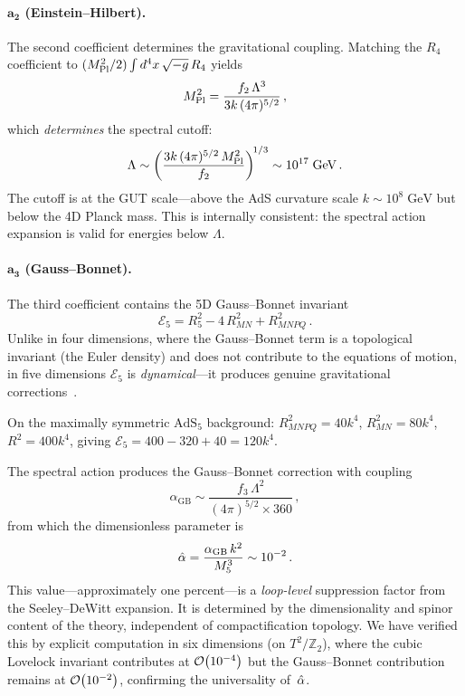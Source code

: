 \paragraph{$\bm{a_2}$ (Einstein--Hilbert).} The second coefficient determines the gravitational coupling. Matching the $R_4$ coefficient to $(M_{\mathrm{Pl}}^2/2)\int d^4x\, \sqrt{-g}\, R_4$ yields
\begin{equation}
\label{eq:1-mpl-spectral}
M_{\mathrm{Pl}}^2 = \frac{f_2\, \Lambda^3}{3k\,(4\pi)^{5/2}}\,,
\end{equation}
which \emph{determines} the spectral cutoff:
\begin{equation}
\label{eq:1-cutoff}
\Lambda \sim \left(\frac{3k\,(4\pi)^{5/2}\, M_{\mathrm{Pl}}^2}{f_2}\right)^{\!1/3} \sim 10^{17}\;\mathrm{GeV}\,.
\end{equation}
The cutoff is at the GUT scale---above the AdS curvature scale $k \sim 10^8\;\mathrm{GeV}$ but below the 4D Planck mass. This is internally consistent: the spectral action expansion is valid for energies below $\Lambda$.

\paragraph{$\bm{a_3}$ (Gauss--Bonnet).} The third coefficient contains the 5D Gauss--Bonnet invariant
\begin{equation}
\label{eq:1-gb-invariant}
\mathcal{E}_5 = R_5^2 - 4\, R_{MN}^2 + R_{MNPQ}^2\,.
\end{equation}
Unlike in four dimensions, where the Gauss--Bonnet term is a topological invariant (the Euler density) and does not contribute to the equations of motion, in five dimensions $\mathcal{E}_5$ is \emph{dynamical}---it produces genuine gravitational corrections~\cite{ch1:davis03}.

On the maximally symmetric $\mathrm{AdS}_5$ background: $R_{MNPQ}^2 = 40k^4$, $R_{MN}^2 = 80k^4$, $R^2 = 400k^4$, giving $\mathcal{E}_5 = 400 - 320 + 40 = 120k^4$.

The spectral action produces the Gauss--Bonnet correction with coupling
\begin{equation}
\label{eq:1-alpha-gb}
\alpha_{\mathrm{GB}} \sim \frac{f_3\, \Lambda^2}{(4\pi)^{5/2} \times 360}\,,
\end{equation}
from which the dimensionless parameter is
\begin{equation}
\label{eq:1-alpha-hat}
\hat{\alpha} = \frac{\alpha_{\mathrm{GB}}\, k^2}{M_5^3} \sim 10^{-2}\,.
\end{equation}
This value---approximately one percent---is a \emph{loop-level} suppression factor from the Seeley--DeWitt expansion. It is determined by the dimensionality and spinor content of the theory, independent of compactification topology. We have verified this by explicit computation in six dimensions (on $T^2/\mathbb{Z}_2$), where the cubic Lovelock invariant contributes at $\mathcal{O}\!\left(10^{-4}\right)$ but the Gauss--Bonnet contribution remains at $\mathcal{O}\!\left(10^{-2}\right)$, confirming the universality of~$\hat{\alpha}$.

